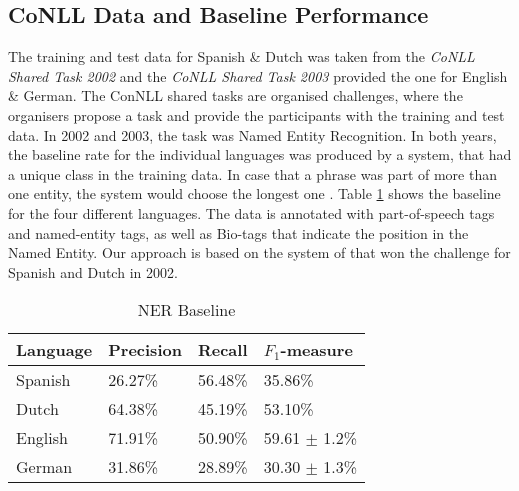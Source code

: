 \documentclass[11pt]{article}
\begin{document}
\subsection{CoNLL Data and Baseline Performance}
The training and test data for Spanish \& Dutch was taken from the \emph{CoNLL Shared Task 2002} \cite{tksintro} and 
the \emph{CoNLL Shared Task 2003} \cite{TjongKimSang:2003:ICS:1119176.1119195} provided the one for English \& German.
The ConNLL shared tasks are organised challenges, where the organisers propose a task and provide the participants with the
training and test data. 
In 2002 and 2003, the task was Named Entity Recognition. 
In both years, the baseline rate for the individual languages was produced by a system, that had a unique class in the training data. 
In case that a phrase was part of more than one entity, the system would choose the longest one \cite{TjongKimSang:2003:ICS:1119176.1119195}. 
Table \ref{table:Base} shows the baseline for the four different languages.  
The data is annotated with part-of-speech tags and named-entity tags, as well as Bio-tags that indicate the position in the Named Entity. %
Our approach is based on the system of \cite{strlearn} that won the challenge for Spanish and Dutch in 2002. 



\begin{table}[h!]
\scriptsize
\begin{tabular}{|l|l|l|l|}
\hline
\bf Language & \bf Precision & \bf Recall & \bf $F_1$-measure \\ \hline
Spanish &             26.27\% & 56.48\% & 35.86\%        \\
Dutch  &             64.38\%  &45.19\%    & 53.10\%  \\
English &              71.91\%& 50.90\%  & 59.61 $\pm$ 1.2\%\\
German &      31.86\%  & 28.89\% & 30.30  $\pm$ 1.3\% \\
\hline
\end{tabular}
\caption{NER Baseline}
\label{table:Base}
\end{table}
\end{document}

